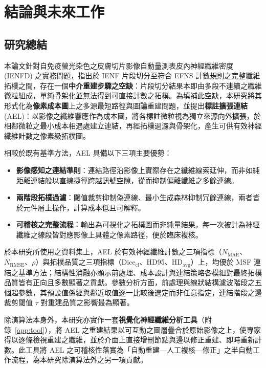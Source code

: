 
\chapter{結論與未來工作}
\label{chap:conclusion}

\section{研究總結}
\label{sec:summary}

本論文針對自免疫螢光染色之皮膚切片影像自動量測表皮內神經纖維密度 (IENFD) 之實務問題，指出於 IENF 片段切分至符合 EFNS 計數規則之完整纖維拓樸之間，存在一個\textbf{中介重建步驟之空缺}：片段切分結果本即由多段不連續之纖維微粒組成，單純骨架化並無法得到可直接計數之拓樸。為填補此空缺，本研究將其形式化為\textbf{像素成本圖}上之多源最短路徑與圖論重建問題，並提出\textbf{標註擴張連結} (AEL)：以影像之纖維響應作為成本圖，將各標註微粒視為獨立來源向外擴張，於相鄰微粒之最小成本相遇處建立連結，再經拓樸過濾與骨架化，產生可供有效神經纖維計數之像素級拓樸圖。

相較於既有基準方法，AEL 具備以下三項主要優勢：

\begin{itemize}
  \item \textbf{影像感知之連結準則}：連結路徑沿影像上實際存在之纖維線索延伸，而非如純距離連結般以直線捷徑跨越訊號空隙，從而抑制偏離纖維之多餘連線。
  \item \textbf{兩階段拓樸過濾}：閾值裁剪抑制偽連線、最小生成森林抑制冗餘連線，兩者皆於元件層上操作，計算成本低且可解釋。
  \item \textbf{可稽核之完整流程}：輸出為可視化之拓樸圖而非純量結果，每一次被計為神經纖維之線段皆對應影像上具體之像素路徑，便於臨床複核。
\end{itemize}

於本研究所使用之資料集上，AEL 於有效神經纖維計數之三項指標（$N_{\text{MAE}}$、$N_{\text{RMSE}}$、$\rho$）與拓樸品質之三項指標（$\text{Dice}_{\text{cl}}$、HD95、$\text{HD}_{\text{avg}}$）上，均優於 MSF 連結之基準方法；結構性消融亦顯示前處理、成本設計與連結策略各模組對最終拓樸品質皆有正向且多數顯著之貢獻。參數分析方面，前處理與線狀結構濾波階段之五個超參數，其預設值係經與鄰近取值逐一比較後選定而非任意指定，連結階段之邊裁剪閾值 $\tau$ 對重建品質之影響最為顯著。

除演算法本身外，本研究亦實作一套\textbf{視覺化神經纖維分析工具}（附錄~\ref{app:tool}），將 AEL 之重建結果以可互動之圖層疊合於原始影像之上，使專家得以逐條檢視重建之纖維，並於介面上直接增刪節點與邊以修正重建、即時重新計數。此工具將 AEL 之可稽核性落實為「自動重建—人工複核—修正」之半自動工作流程，為本研究除演算法外之另一項貢獻。

